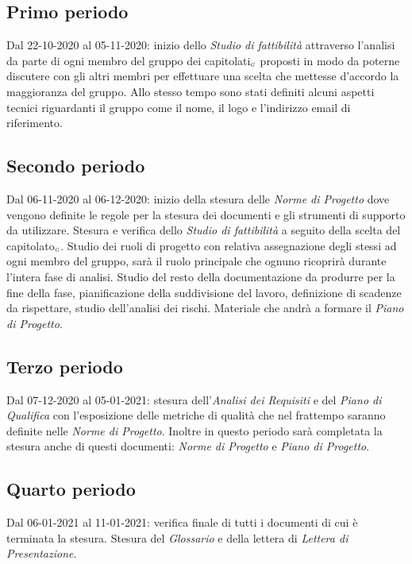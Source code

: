 \subsection{Primo periodo}\label{PianificazioneAnalisiPrimoPeriodo}
Dal 22-10-2020 al 05-11-2020: inizio dello \textit{Studio di fattibilità} attraverso l'analisi da parte di ogni membro del gruppo dei capitolati$_{\scaleto{G}{3pt}}$ proposti in modo da poterne discutere con gli altri membri per effettuare una scelta che mettesse d'accordo la maggioranza del gruppo.
Allo stesso tempo sono stati definiti alcuni aspetti tecnici riguardanti il gruppo come il nome, il logo e l'indirizzo email di riferimento.
\subsection{Secondo periodo}\label{PianificazioneAnalisiSecondoPeriodo}
Dal 06-11-2020 al 06-12-2020: inizio della stesura delle \textit{Norme di Progetto} dove vengono definite le regole per la stesura dei documenti e gli strumenti di supporto da utilizzare. Stesura e verifica dello \textit{Studio di fattibilità} a seguito della scelta del capitolato$_{\scaleto{G}{3pt}}$.
Studio dei ruoli di progetto con relativa assegnazione degli stessi ad ogni membro del gruppo, sarà il ruolo principale che ognuno ricoprirà durante l'intera fase di analisi.
Studio del resto della documentazione da produrre per la fine della fase, pianificazione della suddivisione del lavoro, definizione di scadenze da rispettare, studio dell'analisi dei rischi. Materiale che andrà a formare il \textit{Piano di Progetto}.
\subsection{Terzo periodo}\label{PianificazioneAnalisiTerzoPeriodo}
Dal 07-12-2020 al 05-01-2021: stesura dell'\textit{Analisi dei Requisiti} e del \textit{Piano di Qualifica} con l'esposizione delle metriche di qualità che nel frattempo saranno definite nelle \textit{Norme di Progetto}. Inoltre in questo periodo sarà completata la stesura anche di questi documenti: \textit{Norme di Progetto} e \textit{Piano di Progetto}.
\subsection{Quarto periodo}\label{PianificazioneAnalisiQuartoPeriodo}
Dal 06-01-2021 al 11-01-2021: verifica finale di tutti i documenti di cui è terminata la stesura. Stesura del \textit{Glossario} e della lettera di \textit{Lettera di Presentazione}.
